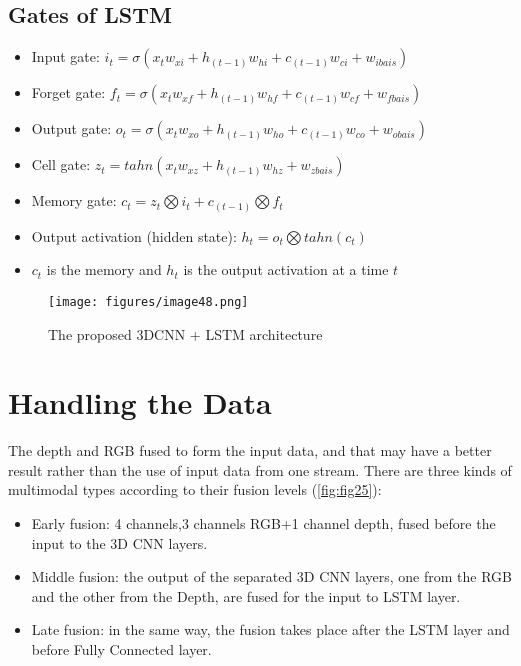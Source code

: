 \documentclass[12pt]{book}
\begin{document}
\subsection{Gates of LSTM}
\begin{itemize}
    \item Input gate: $i_t=\sigma(x_tw_{xi}+h_{(t-1)}w_{hi}+c_{(t-1)}w_{ci}+w_{ibais})$
    \item Forget gate: $f_t=\sigma(x_tw_{xf}+h_{(t-1)}w_{hf}+c_{(t-1)}w_{cf}+w_{fbais})$
    \item Output gate: $o_t=\sigma(x_tw_{xo}+h_{(t-1)}w_{ho}+c_{(t-1)}w_{co}+w_{obais})$
    \item Cell gate: $z_t=tahn(x_tw_{xz}+h_{(t-1)}w_{hz}+w_{zbais})$
    \item Memory gate: $c_t=z_t\bigotimes i_t+c_{(t-1)}\bigotimes f_t$
    \item Output activation (hidden state): $h_t=o_t\bigotimes tahn(c_t)$
    \item $c_t$ is the memory and $h_t$ is the output activation at a time $t$
\end{itemize}

\begin{figure}[!htbp]
\centering
  \texttt{[image: figures/image48.png]}
  \\
  \caption{The proposed 3DCNN + LSTM architecture \cite{NOO2019}}
  \label{fig:fig24}
\end{figure}

\section{Handling the Data}
The depth and RGB fused to form the input data, and that may have a better result rather than the use of input data from one stream. There are three kinds of multimodal types according to their fusion levels (\ref{fig:fig25}): 

\begin{itemize}
    \item Early fusion: 4 channels,3 channels RGB+1 channel depth, fused before the input to the 3D CNN layers. 
\item Middle fusion: the output of the separated 3D CNN layers, one from the RGB and the other from the Depth, are fused for the input to LSTM layer. 

\item Late fusion: in the same way, the fusion takes place after the LSTM layer and before Fully Connected layer. 
\end{itemize}
\end{document}
